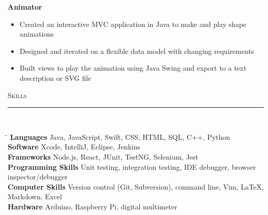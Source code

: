\documentclass[11pt]{article}
\begin{document}
\begin{raggedright}
	\textbf{\large Animator} 
	\begin{itemize}
		\item Created an interactive MVC application in Java to make and play shape animations
		\item Designed and iterated on a flexible data model with changing requirements
		\item Built views to play the animation using Java Swing and export to a text description or SVG file 
	\end{itemize}
	\vspace{0.1in}
	
	
	\textsc{\Large Skills} \\
	\vspace{-0.1in}
	\rule{\textwidth}{0.4pt} \\
	\vspace{0.05in}

	\begin{tabbing}
		\hspace*{4cm}\= \kill
		\textbf{Languages}  \> Java, JavaScript, Swift, CSS, HTML, SQL, C++, Python \\
		\textbf{Software} \> Xcode, IntelliJ, Eclipse, Jenkins \\
		\textbf{Frameworks} \> Node.js, React, JUnit, TestNG, Selenium, Jest  \\
		\textbf{Programming Skills} \> Unit testing, integration testing, IDE debugger, browser inspector/debugger \\
		\textbf{Computer Skills} \> Version control (Git, Subversion), command line, Vim, LaTeX, Markdown, Excel \\
		\textbf{Hardware} \> Arduino, Raspberry Pi, digital multimeter \\
	\end{tabbing}

	
\end{raggedright}	
\end{document}
